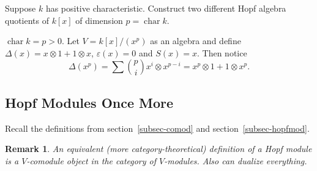\documentclass[12pt]{article}
\theoremstyle{break}
\theoremstyle{nonumberbreak}
\theoremstyle{changebreak}
\theoremstyle{break}
\theoremstyle{nonumberbreak}
\theoremstyle{nonumberplain}
\theoremstyle{change}
\newtheorem{rmk}[thm]{Remark}
\DeclareMathOperator{\ch}{char}
\begin{document}
\begin{prob}
	Suppose $k$ has positive characteristic. Construct two different Hopf algebra quotients of $k[x]$ of dimension $p=\ch k$.
\end{prob}

\begin{ex}
	$\ch k=p>0$. Let $V=k[x]/(x^p)$ as an algebra and define $\Delta(x)=x\otimes 1+1\otimes x$,
	$\varepsilon(x)=0$ and $S(x)=x$. Then notice
	\[\Delta(x^p)=\sum\binom{p}{i}x^i\otimes x^{p-i}=x^p\otimes 1+1\otimes x^p.\]
\end{ex}

\subsection{Hopf Modules Once More}
Recall the definitions from section~\ref{subsec-comod} and section~\ref{subsec-hopfmod}.

\begin{rmk}
	An equivalent (more category-theoretical) definition of a Hopf module is a $V$-comodule object in 
	the category of $V$-modules. Also can dualize everything.
\end{rmk}
\end{document}
